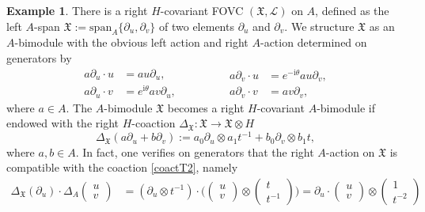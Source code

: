 \documentclass{article}
\theoremstyle{definition}
\newtheorem{example}[thm]{Example}
\begin{document}
\begin{example}
		There is a right $H$-covariant FOVC $(\mathfrak{X},\mathscr{L})$ on $A$, defined as the left $A$-span $\mathfrak{X}:=\mathrm{span}_A\{\partial_u,\partial_v\}$ of two elements $\partial_u$ and $\partial_v$. We structure $\mathfrak{X}$ as an $A$-bimodule with the obvious left action and right $A$-action determined on generators by
		\begin{equation}
			\begin{split}
				a\partial_u\cdot u
				&=au\partial_u,\\
				a\partial_u\cdot v
				&=e^{\mathrm{i}\theta}av\partial_u,
			\end{split}\qquad\qquad
			\begin{split}
				a\partial_v\cdot u
				&=e^{-\mathrm{i}\theta}au\partial_v,\\
				a\partial_v\cdot v
				&=av\partial_v,
			\end{split}
		\end{equation}
		where $a\in A$. The $A$-bimodule $\mathfrak{X}$ becomes a right $H$-covariant $A$-bimodule if endowed with the right $H$-coaction $\Delta_\mathfrak{X}\colon\mathfrak{X}\to\mathfrak{X}\otimes H$
		\begin{equation}\label{coactT2}
			\Delta_\mathfrak{X}(a\partial_u+b\partial_v)
			:=a_0\partial_u\otimes a_1t^{-1}+b_0\partial_v\otimes b_1t,
		\end{equation}
		where $a,b\in A$. In fact, one verifies on generators that the right $A$-action on $\mathfrak{X}$ is compatible with the coaction \eqref{coactT2}, namely
		\begin{align*}
			\Delta_\mathfrak{X}(\partial_u)\cdot\Delta_A\begin{pmatrix}
				u \\
				v
			\end{pmatrix}
			&=(\partial_u\otimes t^{-1})\cdot\bigg(\begin{pmatrix}
				u \\
				v
			\end{pmatrix}\otimes\begin{pmatrix}
				t \\
				t^{-1}
			\end{pmatrix}\bigg)
			=\partial_u\cdot\begin{pmatrix}
				u \\
				v
			\end{pmatrix}\otimes\begin{pmatrix}
				1 \\
				t^{-2}
			\end{pmatrix}

\end{align*}
\end{example}
\end{document}
